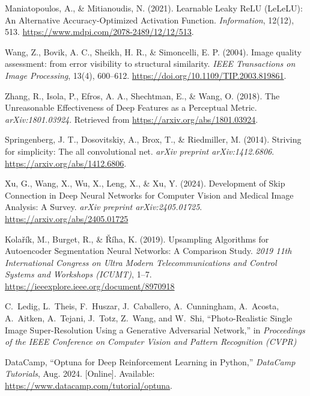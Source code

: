 \documentclass[twocolumn]{article}
\begin{document}
\begin{thebibliography}{99}
     Maniatopoulos, A., \& Mitianoudis, N. (2021). Learnable Leaky ReLU (LeLeLU): An Alternative Accuracy-Optimized Activation Function. \textit{Information}, 12(12), 513. \url{https://www.mdpi.com/2078-2489/12/12/513}.
    
     Wang, Z., Bovik, A. C., Sheikh, H. R., \& Simoncelli, E. P. (2004). Image quality assessment: from error visibility to structural similarity. \textit{IEEE Transactions on Image Processing}, 13(4), 600–612. \url{https://doi.org/10.1109/TIP.2003.819861}.
    
     Zhang, R., Isola, P., Efros, A. A., Shechtman, E., \& Wang, O. (2018). The Unreasonable Effectiveness of Deep Features as a Perceptual Metric. \textit{arXiv:1801.03924}. Retrieved from \url{https://arxiv.org/abs/1801.03924}.

     Springenberg, J. T., Dosovitskiy, A., Brox, T., \& Riedmiller, M. (2014). Striving for simplicity: The all convolutional net. \textit{arXiv preprint arXiv:1412.6806}. \url{https://arxiv.org/abs/1412.6806}.
  
     Xu, G., Wang, X., Wu, X., Leng, X., \& Xu, Y. (2024). Development of Skip Connection in Deep Neural Networks for Computer Vision and Medical Image Analysis: A Survey. \textit{arXiv preprint arXiv:2405.01725}. \url{https://arxiv.org/abs/2405.01725}

     Kolařík, M., Burget, R., \& Říha, K. (2019). Upsampling Algorithms for Autoencoder Segmentation Neural Networks: A Comparison Study. \textit{2019 11th International Congress on Ultra Modern Telecommunications and Control Systems and Workshops (ICUMT)}, 1–7. \url{https://ieeexplore.ieee.org/document/8970918}

     C.~Ledig, L.~Theis, F.~Huszar, J.~Caballero, A.~Cunningham, A.~Acosta, A.~Aitken, A.~Tejani, J.~Totz, Z.~Wang, and W.~Shi, ``Photo-Realistic Single Image Super-Resolution Using a Generative Adversarial Network,'' in \emph{Proceedings of the IEEE Conference on Computer Vision and Pattern Recognition (CVPR)}

     DataCamp, ``Optuna for Deep Reinforcement Learning in Python,'' \textit{DataCamp Tutorials}, Aug. 2024. [Online]. Available: \url{https://www.datacamp.com/tutorial/optuna}.


  \end{thebibliography}
\end{document}
